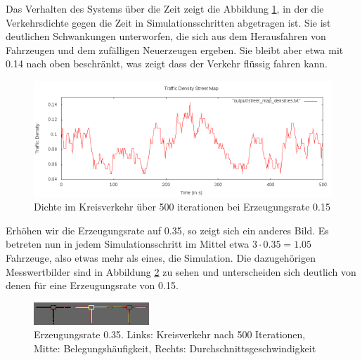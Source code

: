 \documentclass[11pt, a4paper]{article}
\begin{document}
Das Verhalten des Systems über die Zeit zeigt die Abbildung \ref{fig:roundabout015density}, in der die Verkehrsdichte gegen die Zeit in Simulationsschritten abgetragen ist. Sie ist deutlichen Schwankungen unterworfen, die sich aus dem Herausfahren von Fahrzeugen und dem zufälligen Neuerzeugen ergeben. Sie bleibt aber etwa mit 0.14 nach oben beschränkt, was zeigt dass der Verkehr flüssig fahren kann.

\begin{figure}[h!]
	\centering
	\includegraphics[width=\textwidth]{img/roundabout_015_densities}
	\caption{Dichte im Kreisverkehr über 500 iterationen bei Erzeugungsrate 0.15}
	\label{fig:roundabout015density}
\end{figure}

Erhöhen wir die Erzeugungsrate auf 0.35, so zeigt sich ein anderes Bild. Es betreten nun in jedem Simulationsschritt im Mittel etwa $3 \cdot 0.35 = 1.05$ Fahrzeuge, also etwas mehr als eines, die Simulation. Die dazugehörigen Messwertbilder sind in Abbildung \ref{fig:roundabout035} zu sehen und unterscheiden sich deutlich von denen für eine Erzeugungsrate von 0.15.

\begin{figure}[h!]
	\centering
	\includegraphics[width=\textwidth]{img/roundabout_035}
	\caption{Erzeugungsrate 0.35. Links: Kreisverkehr nach 500 Iterationen, Mitte: Belegungshäufigkeit, Rechts: Durchschnittsgeschwindigkeit}
	\label{fig:roundabout035}
\end{figure}
\end{document}
